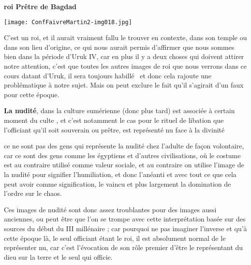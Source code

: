 \documentclass[a4paper]{article}
\begin{document}
\bigskip


\bigskip


\bigskip


\bigskip


\bigskip


\bigskip


\bigskip


\bigskip


\bigskip

{
\textbf{roi Prêtre de Bagdad}}


\bigskip

 \texttt{[image: ConfFaivreMartin2-img018.jpg]} 


\bigskip


\bigskip

{
C'est un roi, et il aurait vraiment fallu le trouver en contexte, dans son temple ou dans son lieu d'origine, ce qui
nous aurait permis d'affirmer que nous sommes bien dans la période d'Uruk IV, car en plus il y a deux choses qui
doivent attirer notre attention, c'est que toutes les autres images de roi que nous verrons dans ce cours datant
d'Uruk, il sera toujours habillé \ et donc cela rajoute une problématique à notre sujet. Mais on peut exclure le fait
qu'il s'agirait d'un faux pour cette époque.}


\bigskip

{
\textbf{La nudité}, dans la culture sumérienne (donc plus tard) est associée à certain moment du culte , et c'est
notamment le cas pour le rituel de libation que l'officiant qu'il soit souverain ou prêtre, est représenté nu face à la
divinité}

{
ce ne sont pas des gens qui représente la nudité chez l'adulte de façon volontaire, car ce sont des gens comme les
égyptiens et d'autres civilisations, où le costume est au contraire utilisé comme valeur sociale, et au contraire on
utilise l'image de la nudité pour signifier l'humiliation, et donc l'anéanti et avec tout ce que cela peut avoir comme
signification, le vaincu et plus largement la domination de l'ordre sur le chaos.}

{
Ces images de nudité sont donc assez troublantes pour des images aussi anciennes, ou peut être que l'on se trompe avec
cette interprétation basée sur des sources du début du III millénaire ; car pourquoi ne pas imaginer l'inverse et qu'à
cette époque là, le seul officiant étant le roi, il est absolument normal de le représenter nu, car c'est l'évocation
de son rôle premier d'être le représentant du dieu sur la terre et le seul qui officie.}
\end{document}
